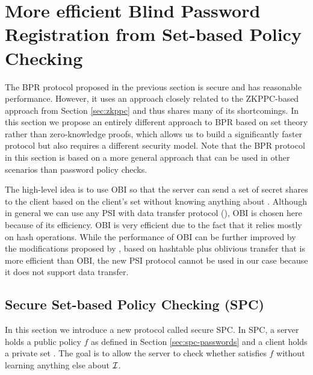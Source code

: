 \section[SPC-based Password Registration]{More efficient Blind Password Registration from Set-based Policy Checking}\label{sec:spc-bpr}

The \ac{BPR} protocol proposed in the previous section is secure and has reasonable performance.
However, it uses an approach closely related to the \ac{ZKPPC}-based approach from Section \ref{sec:zkppc} and thus shares many of its shortcomings.
In this section we propose an entirely different approach to \acl{BPR} based on set theory rather than zero-knowledge proofs, which allows us to build a significantly faster protocol but also requires a different security model.
Note that the \ac{BPR} protocol in this section is based on a more general approach that can be used in other scenarios than password policy checks.

The high-level idea is to use \ac{OBI} so that the server can send a set of secret shares to the client based on the client's set \ClientSet without knowing anything about \ClientSet. 
Although in general we can use any \ac{PSI} with data transfer protocol (\eg \citet{fre04}), \ac{OBI} is chosen here because of its efficiency. 
\ac{OBI} is very efficient due to the fact that it relies mostly on hash operations. 
While the performance of \ac{OBI} can be further improved by the modifications proposed by \citet{Pinkas0Z14}, based on hashtable plus oblivious transfer that is more efficient than \ac{OBI}, the new \ac{PSI} protocol cannot be used in our case because it does not support data transfer.

\subsection{Secure Set-based Policy Checking (SPC)} \label{sec:spc}
In this section we introduce a new protocol called secure \ac{SPC}. 
In \ac{SPC}, a server holds a public policy $f$ as defined in Section \ref{sec:spc-passwords} and a client holds a private set \ClientSet. 
The goal is to allow the server to check whether \ClientSet satisfies $f$ without learning anything else about $\mathcal{I}$. 

